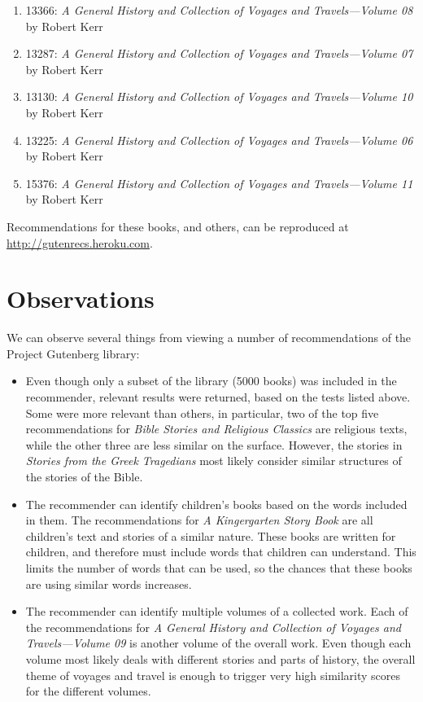 \documentclass[10pt]{report}
\begin{document}
\begin{itemize}
\begin{enumerate}
\item
13366: \textit{A General History and Collection of Voyages and Travels---Volume 08} by Robert Kerr
\item
13287: \textit{A General History and Collection of Voyages and Travels---Volume 07} by Robert Kerr
\item
13130: \textit{A General History and Collection of Voyages and Travels---Volume 10} by Robert Kerr
\item
13225: \textit{A General History and Collection of Voyages and Travels---Volume 06} by Robert Kerr
\item
15376: \textit{A General History and Collection of Voyages and Travels---Volume 11} by Robert Kerr
\end{enumerate}
\end{itemize}

Recommendations for these books, and others, can be reproduced at \url{http://gutenrecs.heroku.com}.

\section*{Observations}
We can observe several things from viewing a number of recommendations of the Project Gutenberg library:

\begin{itemize}
\item
Even though only a subset of the library (5000 books) was included in the recommender, relevant results were returned, based on the tests listed above. Some were more relevant than others, in particular, two of the top five recommendations for \textit{Bible Stories and Religious Classics} are religious texts, while the other three are less similar on the surface. However, the stories in \textit{Stories from the Greek Tragedians} most likely consider similar structures of the stories of the Bible.
\item
The recommender can identify children's books based on the words included in them. The recommendations for \textit{A Kingergarten Story Book} are all children's text and stories of a similar nature. These books are written for children, and therefore must include words that children can understand. This limits the number of words that can be used, so the chances that these books are using similar words increases.
\item
The recommender can identify multiple volumes of a collected work. Each of the recommendations for \textit{A General History and Collection of Voyages and Travels---Volume 09} is another volume of the overall work.  Even though each volume most likely deals with different stories and parts of history, the overall theme of voyages and travel is enough to trigger very high similarity scores for the different volumes.
\end{itemize}
\end{document}
